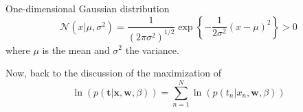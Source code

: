 \begin{frame}{\insertsubsection}

\begin{block}{One-dimensional Gaussian distribution}
\begin{equation*}
	\mathcal{N}(x | \mu, \sigma^2) = \frac{1}{(2 \pi \sigma^2)^{1/2}} \exp \left\{ -\frac{1}{2 \sigma^2} (x- \mu)^2 \right\} > 0
\end{equation*}
where $\mu$ is the mean and $\sigma^2$ the variance.
\end{block}

\end{frame}

\begin{frame}{\insertsubsection}

Now, back to the discussion of the maximization of 
\begin{equation*}
		\ln \left( p( \mathbf{t}| \mathbf{x}, \mathbf{w}, \beta) \right) = \sum_{n=1}^N \ln \left(   p \left( t_n | x_n, \mathbf{w}, \beta \right) \right)
\end{equation*}


\end{frame}


